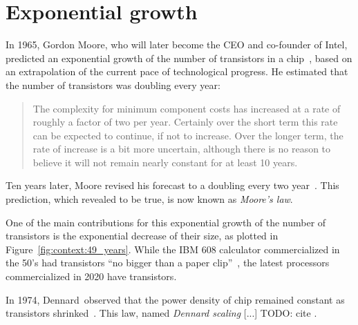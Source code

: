     \section{Exponential growth}%
    \label{sec:exponential_growth}

        In 1965, Gordon Moore, who will later become the CEO and co-founder of Intel, predicted an exponential growth of
        the number of transistors in a chip~\cite{moore:1965}, based on an extrapolation of the current pace of
        technological progress. He estimated that the number of transistors was doubling every year:
        \begin{quote}
            The complexity for minimum component costs has increased at a rate of roughly a factor of two per year.
            Certainly over the short term this rate can be expected to continue, if not to increase. Over the longer
            term, the rate of increase is a bit more uncertain, although there is no reason to believe it will not
            remain nearly constant for at least 10 years.
        \end{quote}

        Ten years later, Moore revised his forecast to a doubling every two year~\cite{moore:1975}. This prediction,
        which revealed to be true, is now known as \emph{Moore's law}.

        One of the main contributions for this exponential growth of the number of transistors is the exponential
        decrease of their size, as plotted in Figure~\ref{fig:context:49_years}. While the IBM 608 calculator
        commercialized in the 50's had transistors ``no bigger than a paper clip''~\cite{ibm608}, the latest processors
        commercialized in 2020 have  transistors.

        In 1974, Dennard~\etal observed that the power density of chip remained constant as transistors
        shrinked~\cite{dennard}. This law, named \emph{Dennard scaling} [...]
        TODO: cite \cite{Esmaeilzadeh_2011}.

